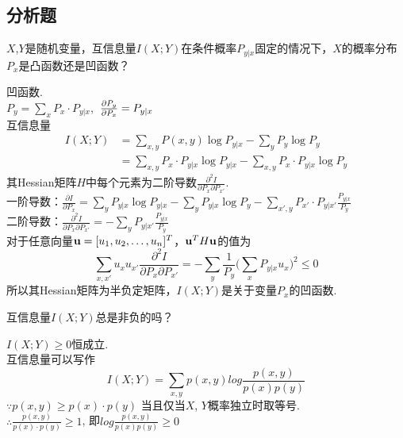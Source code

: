 \documentclass[a4paper]{exam}
\begin{document}
\begin{CJK*}{UTF8}{gbsn}
\section*{分析题}
\begin{questions}
    \question 
$X$,$Y$是随机变量，互信息量$I(X;Y)$在条件概率${P_{y|x}}$固定的情况下，$X$的概率分布${P_x}$是凸函数还是凹函数？
    \begin{solution}
    凹函数.\\
   ${P_y} = \sum\limits_x {{P_x} \cdot {P_{y|x}}}$, ${\kern 1pt} {\kern 1pt} \frac{{\partial {P_y}}}{{\partial {P_x}}} = {P_{y|x}}$\\互信息量
   \begin{equation*}
 \begin{split}
   I(X;Y) & = \sum\limits_{x,y} {P(x,y)\log {P_{y|x}}}  - \sum\limits_y {{P_y}\log {P_y}}\\
      & = \sum\limits_{x,y} {{P_x} \cdot {P_{y|x}}\log {P_{y|x}}}  - \sum\limits_{x,y} {{P_x} \cdot {P_{y|x}}\log {P_y}} 
   \end{split}
   \end{equation*}
   其Hessian矩阵$H$中每个元素为二阶导数$\frac{{{\partial ^2}I}}{{\partial {P_x}\partial {P_{x'}}}}$.\\
   一阶导数：$\frac{{\partial I}}{{\partial {P_x}}} = \sum\limits_y {{P_{y|x}}\log {P_{y|x}}}  - \sum\limits_y {{P_{y|x}}\log {P_y}}  - \sum\limits_{x',y} {{P_{x'}} \cdot {P_{y|x'}}\frac{{{P_{y|x}}}}{{{P_y}}}} $\\
   二阶导数：$\frac{{{\partial ^2}I}}{{\partial {P_x}\partial {P_{x'}}}} =  - \sum\limits_y {{P_{y|x'}}\frac{{{P_{y|x}}}}{{{P_y}}}} $\\
   对于任意向量${\bf{u}} = {[{u_1},{u_2}, \ldots ,{u_n}]^T}$，${{\bf{u}}^T}H{\bf{u}}$的值为
   \[\sum\limits_{x,x'} {{u_x}{u_{x'}}\frac{{{\partial ^2}I}}{{\partial {P_x}\partial {P_{x'}}}} =  - \sum\limits_y {\frac{1}{{{P_y}}}} } (\sum\limits_x {{P_{y|x}}{u_x}{)^2} \le 0} \]
   所以其Hessian矩阵为半负定矩阵，$I(X;Y)$是关于变量$P_x$的凹函数.
    \end{solution}
    \vspace{1.5cm}
    \question
互信息量$I(X;Y)$总是非负的吗？
    \begin{solution}
    $I(X;Y) \ge 0$恒成立.\\
    互信息量可以写作\[I(X;Y) = \sum\limits_{x,y} {p(x,y)log\frac{{p(x,y)}}{{p(x)p(y)}}} \]
    $\because p(x,y) \ge p(x) \cdot p(y)$ 当且仅当$X$, $Y$概率独立时取等号.\\   $\therefore \frac{{p(x,y)}}{{p(x) \cdot p(y)}} \ge 1$, 即$log\frac{{p(x,y)}}{{p(x)p(y)}} \ge 0$\\

\end{solution}
\end{questions}
\end{CJK*}
\end{document}
